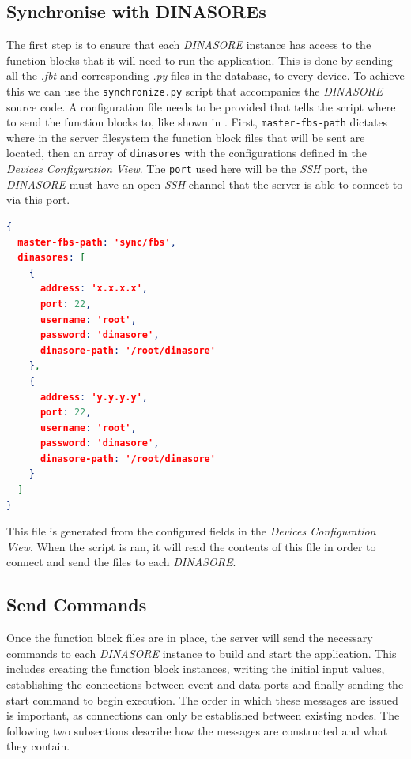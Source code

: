 \subsection{Synchronise with DINASOREs}
The first step is to ensure that each \textit{DINASORE} instance has access to the function blocks that it will need to run the application. This is done by sending all the \textit{.fbt} and corresponding \textit{.py} files in the database, to every device. To achieve this we can use the \texttt{synchronize.py} script that accompanies the \textit{DINASORE} source code. A configuration file needs to be provided that tells the script where to send the function blocks to, like shown in . First, \texttt{master-fbs-path} dictates where in the server filesystem the function block files that will be sent are located, then an array of \texttt{dinasores} with the configurations defined in the \textit{Devices Configuration View}. The \texttt{port} used here will be the \textit{SSH} port, the \textit{DINASORE} must have an open \textit{SSH} channel that the server is able to connect to via this port.

\begin{lstlisting}[language=JSON, caption={Sync configuration}, label={lst:sync-config}]
{
  master-fbs-path: 'sync/fbs',
  dinasores: [
    {
      address: 'x.x.x.x',
      port: 22,
      username: 'root',
      password: 'dinasore',
      dinasore-path: '/root/dinasore'
    },
    {
      address: 'y.y.y.y',
      port: 22,
      username: 'root',
      password: 'dinasore',
      dinasore-path: '/root/dinasore'
    }
  ]
}
\end{lstlisting}

This file is generated from the configured fields in the \textit{Devices Configuration View}. When the script is ran, it will read the contents of this file in order to connect and send the files to each \textit{DINASORE}.


\subsection{Send Commands}
Once the function block files are in place, the server will send the necessary commands to each \textit{DINASORE} instance to build and start the application. This includes creating the function block instances, writing the initial input values, establishing the connections between event and data ports and finally sending the start command to begin execution. The order in which these messages are issued is important, as connections can only be established between existing nodes. The following two subsections describe how the messages are constructed and what they contain.

